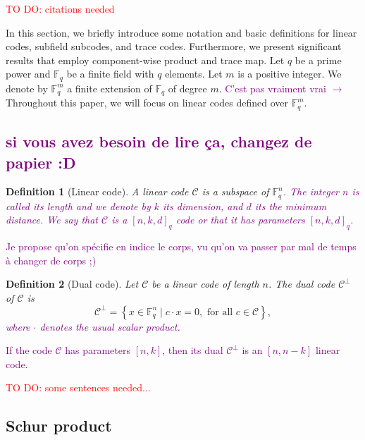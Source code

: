 \documentclass[a4paper]{article}
\newtheorem{def1}{Definition}
\newcommand{\calC}{\mathcal{C}}
\newcommand\jade[1]{\textcolor{purple}{#1}}
\newcommand\TODO[1]{\textcolor{red}{TO DO: #1}}
\begin{document}
{\color{blue}
\TODO{citations needed}

In this section, we briefly introduce some notation and basic definitions for linear codes, subfield subcodes, and trace codes. Furthermore, we present significant results that employ component-wise product and trace map. Let $q$ be a prime power and $\mathbb{F}_q$ be a finite field with $q$ elements. Let $m$ is a positive integer. We denote by $\mathbb{F}_q^m$ a finite extension of $\mathbb{F}_q$ of degree $m$. \jade{C'est pas vraiment vrai $\rightarrow$}Throughout this paper, we will focus on linear codes defined over $\mathbb{F}_q^m$. 

\subsection{\jade{si vous avez besoin de lire ça, changez de papier :D}}

\begin{def1}[Linear code]
  A linear code $\calC$ is a subspace of $\mathbb{F}_{q}^n$. \jade{The integer $n$ is called its length and we denote by $k$ its dimension, and $d$ its the minimum distance. We say that $\calC$ is a $[n,k,d]_q$ code or that it has parameters $[n,k,d]_q$.}
\end{def1}
\jade{Je propose qu'on spécifie en indice le corps, vu qu'on va passer par mal de temps à changer de corps ;)}

\begin{def1}[Dual code]
	Let $\calC$ be a linear code of length $n$. The dual code $\calC^{\perp}$ of $\calC$ is \[
	\calC^{\perp}=\left\lbrace x \in \mathbb{F}_{q}^n \mid c \cdot x=0, \text{ for all } c \in \calC \right\rbrace,
	\]  
	\jade{where $\cdot$ denotes the usual scalar product.}
\end{def1}

\jade{If the code $\calC$ has parameters $\left[n,k \right]$, then its dual $\calC^{\perp}$ is an $[n,n-k]$ linear code.}

\TODO{some sentences needed...}
}

\subsection{Schur product}
\end{document}

